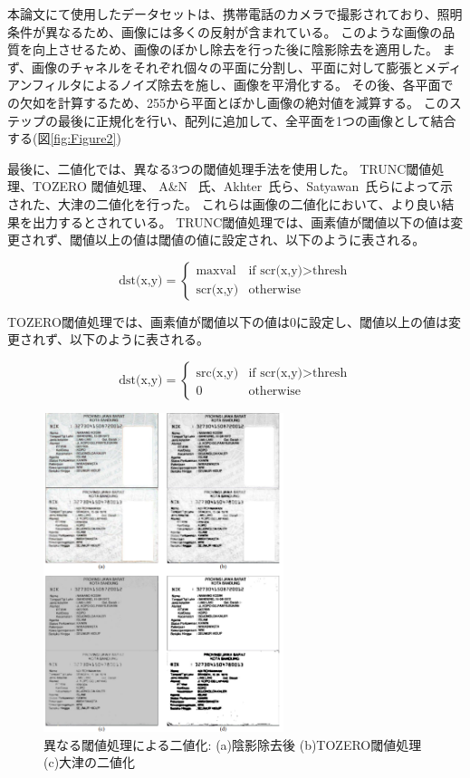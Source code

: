 \documentclass[uplatex, twocolumn,10pt]{jsarticle}
\begin{document}
本論文にて使用したデータセットは、携帯電話のカメラで撮影されており、照明条件が異なるため、画像には多くの反射が含まれている。
このような画像の品質を向上させるため、画像のぼかし除去を行った後に陰影除去を適用した。
まず、画像のチャネルをそれぞれ個々の平面に分割し、平面に対して膨張とメディアンフィルタによるノイズ除去を施し、画像を平滑化する。
その後、各平面での欠如を計算するため、255から平面とぼかし画像の絶対値を減算する。
このステップの最後に正規化を行い、配列に追加して、全平面を1つの画像として結合する(図\ref{fig:Figure2})

最後に、二値化では、異なる3つの閾値処理手法を使用した。
TRUNC閾値処理、TOZERO 閾値処理、 A\&N ~\cite{bib12}氏、Akhter~\cite{bib5}氏ら、Satyawan~\cite{bib4}氏らによって示された、大津の二値化を行った。
これらは画像の二値化において、より良い結果を出力するとされている。
TRUNC閾値処理では、画素値が閾値以下の値は変更されず、閾値以上の値は閾値の値に設定され、以下のように表される。

\begin{equation}
    \text{dst(x,y)} =
    \left\{
    \begin{array}{ll}
        \text{maxval}   & \text{if scr(x,y)} > \text{thresh} \\
        \text{scr(x,y)} & \text{otherwise}
    \end{array}
    \right.
\end{equation}

TOZERO閾値処理では、画素値が閾値以下の値は0に設定し、閾値以上の値は変更されず、以下のように表される。

\begin{equation}
    \text{dst(x,y)} =
    \left\{
    \begin{array}{ll}
        \text{src(x,y)} & \text{if scr(x,y)} > \text{thresh} \\
        0               & \text{otherwise}
    \end{array}
    \right.
\end{equation}

\begin{figure}[t]
    \begin{center}
        \includegraphics*[width=7cm]{image/Figure3.png}
        \caption{異なる閾値処理による二値化: (a)陰影除去後 (b)TOZERO閾値処理 (c)大津の二値化}
        \label{fig:Figure3}
    \end{center}
\end{figure}
\end{document}
